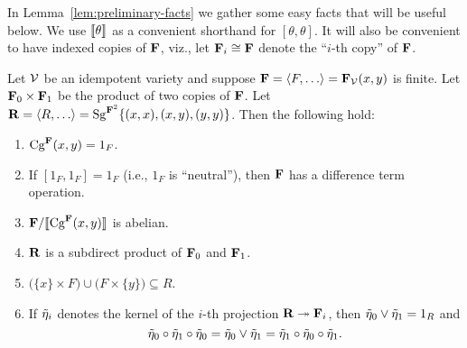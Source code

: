 In Lemma~\ref{lem:preliminary-facts} we gather
some easy facts that will be useful below.
We use $\llbracket \theta \rrbracket$ as a convenient shorthand for 
$[\theta,\theta]$. %
It will also be convenient to have indexed copies of $\mathbf{F}$, viz.,
let $\mathbf{F}_i \cong \mathbf{F}$ denote the ``$i$-th copy'' of $\mathbf{F}$. 
\begin{lemma}
\label{lem:preliminary-facts}
Let $\mathcal{V}$ be an idempotent variety and suppose 
$\bF = \<F, \dots\> = \bF_{\sV}(x,y)$ is finite. 
Let $\mathbf{F}_0 \times \mathbf{F}_1$ be the product of two copies of $\mathbf{F}$.
Let $\bR = \<R, \dots\> = \Sg^{\bF^2}\{(x, x), (x, y), (y, y)\}$. 
Then the following hold:
\begin{enumerate}
\item \label{item:1}
  $\operatorname{Cg}^{\mathbf{F}}(x,y) = 1_F$.

  \smallskip
\item \label{item:1.5}
  If $[1_F, 1_F] = 1_F$ (i.e., $1_F$ is ``neutral''), then
  $\mathbf{F}$ has a difference term operation.

\smallskip
\item \label{item:2}
$\mathbf{F}/\llbracket \operatorname{Cg}^{\mathbf{F}}(x,y) \rrbracket$ is abelian.


\smallskip
\item \label{item:3}
$\mathbf{R}$ is a subdirect product of $\mathbf{F}_0$ and $\mathbf{F}_1$.

\smallskip
\item \label{item:4}
$\bigl(\{x\} \times F\bigr) \cup \bigl(F \times \{y\}\bigr) \subseteq R$.

\smallskip
\item \label{item:5}
If $\tilde{\eta}_i$ denotes the kernel of the
$i$-th projection $\mathbf{R} \twoheadrightarrow \mathbf{F}_i$, then 
$\tilde{\eta}_0 \vee \tilde{\eta}_1 = 1_R$ and 
\[
\tilde{\eta}_0 \circ \tilde{\eta}_1 \circ \tilde{\eta}_0 = \tilde{\eta}_0 \vee \tilde{\eta}_1 = 
  \tilde{\eta}_1 \circ \tilde{\eta}_0 \circ \tilde{\eta}_1.
\]
\end{enumerate}
\end{lemma}

\pagebreak  


